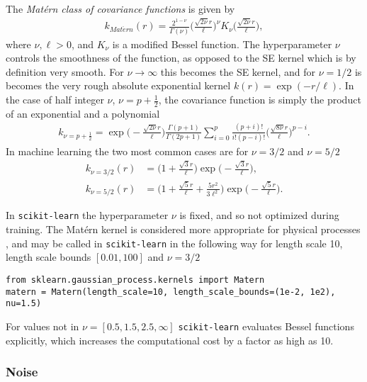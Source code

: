 \documentclass[twoside,english]{uiofysmaster}
\begin{document}
The \textit{Mat\'{e}rn class of covariance functions} is given by
\begin{align}
k_{Mat\acute{e}rn} (r) = \frac{2^{1- \nu}}{\Gamma (\nu)} \Big( \frac{\sqrt{2 \nu} r	}{\ell} \Big)^{\nu} K_{\nu} \Big( \frac{\sqrt{2 \nu}r}{\ell} \Big),
\end{align}
where $\nu, \ell > 0$, and $K_{\nu}$ is a modified Bessel function. The hyperparameter $\nu$ controls the smoothness of the function, as opposed to the SE kernel which is by definition very smooth. For $\nu \rightarrow \infty$ this becomes the SE kernel, and for $\nu = 1/2$ is becomes the very rough absolute exponential kernel $k(r) = \exp (-r/\ell)$. In the case of half integer $\nu$, $\nu = p + \frac{1}{2}$, the covariance function is simply the product of an exponential and a polynomial
\begin{align}
k_{\nu=p+\frac{1}{2}} = \exp \Big(- \frac{\sqrt{2 \nu} r	}{\ell} \Big) \frac{\Gamma(p+1)}{\Gamma(2p + 1)} \sum^p_{i=0} \frac{(p+i)!}{i!(p-i)!} \Big( \frac{\sqrt{8 \nu} r	}{\ell} \Big)^{p-i}.
\end{align}
In machine learning the two most common cases are for $\nu = 3/2$ and $\nu = 5/2$
\begin{align}
k_{\nu = 3/2}(r) &=  \Big(1 + \frac{\sqrt{3}r}{\ell} \Big) \exp \Big( -\frac{\sqrt{3}r}{\ell} \Big),\\
k_{\nu = 5/2}(r) &=  \Big(1 + \frac{\sqrt{5}r}{\ell}  + \frac{5r^2}{3 \ell^2}\Big) \exp \Big( -\frac{\sqrt{5}r}{\ell} \Big).
\end{align}

In \verb|scikit-learn| the hyperparameter $\nu$ is fixed, and so not optimized during training. The Mat\'{e}rn kernel is considered more appropriate for physical processes \cite{rasmussen2006gaussian}, and may be called in \verb|scikit-learn| in the following way for length scale 10, length scale bounds $[0.01, 100]$ and $\nu = 3/2$
\begin{lstlisting}
from sklearn.gaussian_process.kernels import Matern
matern = Matern(length_scale=10, length_scale_bounds=(1e-2, 1e2), nu=1.5)
\end{lstlisting}
For values not in $\nu = [0.5, 1.5, 2.5, \infty]$ \verb|scikit-learn| evaluates Bessel functions explicitly, which increases the computational cost by a factor as high as 10.

\subsubsection{Noise}
\end{document}
